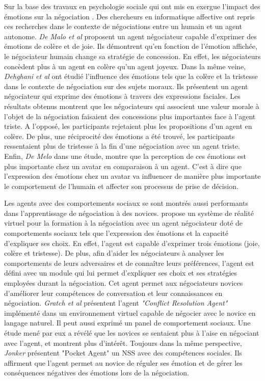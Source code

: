 	 Sur la base des travaux en psychologie sociale qui ont mis en exergue l'impact des émotions sur la négociation \cite{van2006power}. Des chercheurs en informatique affective ont repris ces recherches dans le contexte de négociations entre un humain et un agent autonome. \emph{De Malo et al} \cite{de2011effect,de2015humans} proposent un agent négociateur capable d'exprimer des émotions de colère et de joie. Ils démontrent qu'en fonction de l'émotion affichée, le négociateur humain change sa stratégie de concession. En effet, les négociateurs concèdent plus à un agent en colère qu'un agent joyeux. Dans la même veine, \emph{Dehghani et al} \cite{dehghani2014interpersonal} ont étudié l'influence des émotions tels que la colère et la tristesse dans le contexte de négociation sur des sujets moraux. Ils présentent un agent négociateur qui exprime des émotions à travers des expressions faciales.
	 Les résultats obtenus montrent que les négociateurs qui associent une valeur morale à l'objet de la négociation faisaient des concessions plus importantes face à l'agent triste. A l'opposé, les participants rejetaient plus les propositions d'un agent en colère. De plus, une réciprocité des émotions a été trouvé, les participants ressentaient plus de tristesse à la fin d'une négociation avec un agent triste.  
	 Enfin, \emph{De Melo} \cite{de2015humans} dans une étude, montre que la perception de ces émotions est plus importante chez un avatar en comparaison à un agent. C'est à dire que l'expression des émotions chez un avatar va influencer de manière plus importante le comportement de l'humain et affecter son processus de prise de décision.  
	 
	 
	 Les agents avec des comportements sociaux se sont montrés aussi performants dans l'apprentissage de négociation à des novices. \cite{broekens2012virtual} propose un système de réalité virtuel pour la formation à la négociation avec un agent négociateur doté de comportements sociaux tels que l'expression des émotions et la capacité d'expliquer ses choix. En effet, l'agent est capable d'exprimer trois émotions (joie, colère et tristesse). De plus, afin d'aider les négociateurs à analyser les comportements de leurs adversaires et de connaître leurs préférences, l'agent est défini avec un module qui lui permet d'expliquer ses choix et ses stratégies employées durant la négociation. Cet agent permet aux négociateurs novices d'améliorer leur compétences de conversation et leur connaissances en négociation. 
	 \emph{Gratch et al} \cite{gratch2016benefits} présentent l'agent \textit{"Conflict Resolution Agent"} implémenté dans un environnement virtuel capable de négocier avec le novice en langage naturel. Il peut aussi exprimé un panel de comportement sociaux. Une étude mené par eux a révélé que les novices se sentaient plus à l'aise en négociant avec l'agent, et montrent plus d'intérêt. Toujours dans la même perspective, \emph{Jonker} \cite{jonker2012negotiating} présentent "Pocket Agent" un NSS avec des compétences sociales. Ils affirment que l'agent permet au novice de réguler ses émotion et de gérer les conséquences négatives des émotions lors de la négociation.
	 
